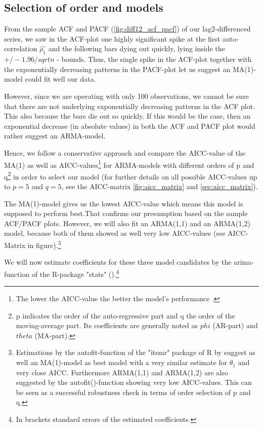 \documentclass[11pt,a4paper]{article}
\begin{document}
\subsection{Selection of order and models}

From the sample ACF and PACF (\cref{fig:diff12_acf_pacf}) of our lag2-differenced series, we saw in the ACF-plot one highly significant spike at the first auto-correlation $\hat{\rho_1}$ and the following bars dying out quickly, lying inside the $+/-1.96/sqrt{n}$ - bounds.
Thus, the single spike in the ACF-plot together with the exponentially decreasing patterns in the PACF-plot let us suggest an MA(1)-model could fit well our data.

However, since we are operating with only 100 observations, we cannot be sure that there are not underlying exponentially decreasing patterns in the ACF plot.
This also because the bars die out so quickly.
If this would be the case, then an exponential decrease (in absolute values) in both the ACF and PACF plot would rather suggest an ARMA-model.


Hence, we follow a conservative approach and compare the AICC-value of the MA(1) as well as AICC-values\footnote{
    The lower the AICC-value the better the model's performance \citep{aic86}.
}
for ARMA-models with different orders of p and q\footnote{
    p indicates the order of the auto-regressive part and q the order of the moving-average part.
    Its coefficients are generally noted as $phi$ (AR-part) and $theta$ (MA-part).
} 
in order to select our model (for further details on all possible AICC-values up to $p=5$ and $q=5$, see the AICC-matrix \cref{fig:aicc_matrix} and \cref{sec:aicc_matrix}).

The MA(1)-model gives us the lowest AICC-value which means this model is supposed to perform best.That confirms our presumption based on the sample ACF/PACF plots.
However, we will also fit an ARMA(1,1) and an ARMA(1,2) model, because both of them showed as well very low AICC-values (see AICC-Matrix in figure).\footnote{
    Estimations by the autofit-function of the "itsmr" package of R by \citet{R_itsmr} suggest as well an MA(1)-model as best model with a very similar estimate for $\theta_1$ and very close AICC.
    Furthermore ARMA(1,1) and ARMA(1,2) are also suggested by the autofit()-function showing very low AICC-values.
    This can be seen as a successful robustness check in terms of order selection of p and q.
}

We will now estimate coefficients for these three model candidates by the arima-function of the R-package "stats" (\citet{R_stats}).\footnote{In brackets standard errors of the estimated coefficients.}
\end{document}
